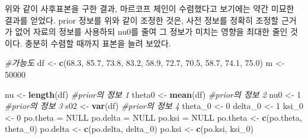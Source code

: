 \documentclass[
]{article}
\newenvironment{Shaded}{\begin{snugshade}}{\end{snugshade}}
\newcommand{\CommentTok}[1]{\textcolor[rgb]{0.56,0.35,0.01}{\textit{#1}}}
\newcommand{\ConstantTok}[1]{\textcolor[rgb]{0.56,0.35,0.01}{#1}}
\newcommand{\DecValTok}[1]{\textcolor[rgb]{0.00,0.00,0.81}{#1}}
\newcommand{\FloatTok}[1]{\textcolor[rgb]{0.00,0.00,0.81}{#1}}
\newcommand{\FunctionTok}[1]{\textcolor[rgb]{0.13,0.29,0.53}{\textbf{#1}}}
\newcommand{\NormalTok}[1]{#1}
\newcommand{\OtherTok}[1]{\textcolor[rgb]{0.56,0.35,0.01}{#1}}
\begin{document}
위와 같이 사후표본을 구한 결과, 마르코프 체인이 수렴했다고 보기에는 약간
미묘한 결과를 얻었다. prior 정보를 위와 같이 조정한 것은, 사전 정보를
정확히 조정할 근거가 없어 자료의 정보를 사용하되 nu0를 줄여 그 정보가
미치는 영향을 최대한 줄인 것이다. 충분히 수렴할 때까지 표본을 늘려
보았다.

\begin{Shaded}
\begin{Highlighting}[]
\CommentTok{\#가능도}
\NormalTok{df }\OtherTok{\textless{}{-}} \FunctionTok{c}\NormalTok{(}\FloatTok{68.3}\NormalTok{, }\FloatTok{85.7}\NormalTok{, }\FloatTok{73.8}\NormalTok{, }\FloatTok{83.2}\NormalTok{, }\FloatTok{58.9}\NormalTok{, }\FloatTok{72.7}\NormalTok{, }\FloatTok{70.5}\NormalTok{, }\FloatTok{58.7}\NormalTok{, }\FloatTok{74.1}\NormalTok{, }\FloatTok{75.0}\NormalTok{)}
\NormalTok{m }\OtherTok{\textless{}{-}} \DecValTok{50000}

\NormalTok{nu }\OtherTok{\textless{}{-}} \FunctionTok{length}\NormalTok{(df) }\CommentTok{\#prior의 정보 1}
\NormalTok{theta0 }\OtherTok{\textless{}{-}} \FunctionTok{mean}\NormalTok{(df) }\CommentTok{\#prior의 정보 2}
\NormalTok{nu0 }\OtherTok{\textless{}{-}} \DecValTok{1} \CommentTok{\#prior의 정보 3}
\NormalTok{s02 }\OtherTok{\textless{}{-}} \FunctionTok{var}\NormalTok{(df) }\CommentTok{\#prior의 정보 4}
\NormalTok{theta\_0 }\OtherTok{\textless{}{-}} \DecValTok{0}
\NormalTok{delta\_0 }\OtherTok{\textless{}{-}} \DecValTok{1}
\NormalTok{ksi\_0 }\OtherTok{\textless{}{-}} \DecValTok{0}
\NormalTok{po.theta }\OtherTok{=} \ConstantTok{NULL}
\NormalTok{po.delta }\OtherTok{=} \ConstantTok{NULL}
\NormalTok{po.ksi }\OtherTok{=} \ConstantTok{NULL}
\NormalTok{po.theta }\OtherTok{\textless{}{-}} \FunctionTok{c}\NormalTok{(po.theta, theta\_0)}
\NormalTok{po.delta }\OtherTok{\textless{}{-}} \FunctionTok{c}\NormalTok{(po.delta, delta\_0)}
\NormalTok{po.ksi }\OtherTok{\textless{}{-}} \FunctionTok{c}\NormalTok{(po.ksi, ksi\_0)}


\end{Highlighting}
\end{Shaded}
\end{document}
